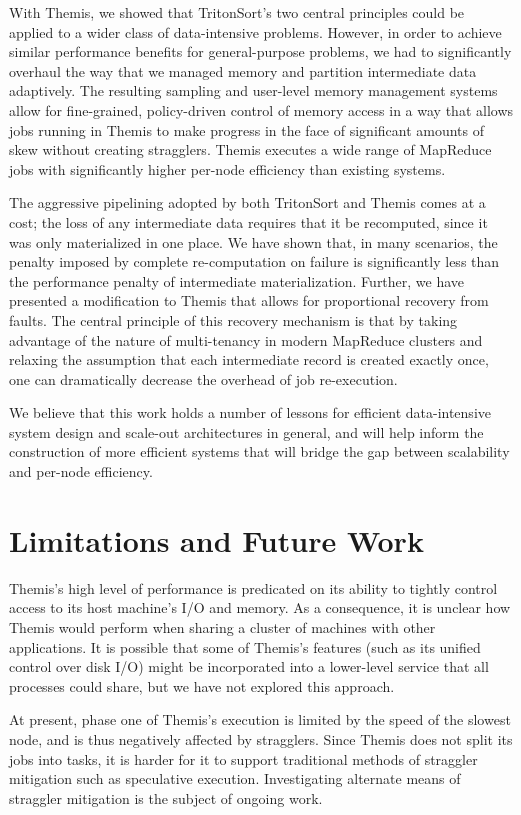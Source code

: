 With Themis, we showed that TritonSort's two central principles could be
applied to a wider class of data-intensive problems. However, in order to
achieve similar performance benefits for general-purpose problems, we had to
significantly overhaul the way that we managed memory and partition
intermediate data adaptively. The resulting sampling and user-level memory
management systems allow for fine-grained, policy-driven control of memory
access in a way that allows jobs running in Themis to make progress in the face
of significant amounts of skew without creating stragglers. Themis executes a
wide range of MapReduce jobs with significantly higher per-node efficiency than
existing systems.

The aggressive pipelining adopted by both TritonSort and Themis comes at a
cost; the loss of any intermediate data requires that it be recomputed, since
it was only materialized in one place. We have shown that, in many scenarios,
the penalty imposed by complete re-computation on failure is significantly less
than the performance penalty of intermediate materialization. Further, we have
presented a modification to Themis that allows for proportional recovery from
faults. The central principle of this recovery mechanism is that by taking
advantage of the nature of multi-tenancy in modern MapReduce clusters and
relaxing the assumption that each intermediate record is created exactly once,
one can dramatically decrease the overhead of job re-execution.

We believe that this work holds a number of lessons for efficient
data-intensive system design and scale-out architectures in general, and will
help inform the construction of more efficient systems that will bridge the gap
between scalability and per-node efficiency.

\section{Limitations and Future Work}

Themis's high level of performance is predicated on its ability to tightly
control access to its host machine's I/O and memory. As a consequence, it is
unclear how Themis would perform when sharing a cluster of machines with other
applications. It is possible that some of Themis's features (such as its
unified control over disk I/O) might be incorporated into a lower-level service
that all processes could share, but we have not explored this approach.

At present, phase one of Themis's execution is limited by the speed of the
slowest node, and is thus negatively affected by stragglers. Since Themis does
not split its jobs into tasks, it is harder for it to support traditional
methods of straggler mitigation such as speculative execution. Investigating
alternate means of straggler mitigation is the subject of ongoing work.

